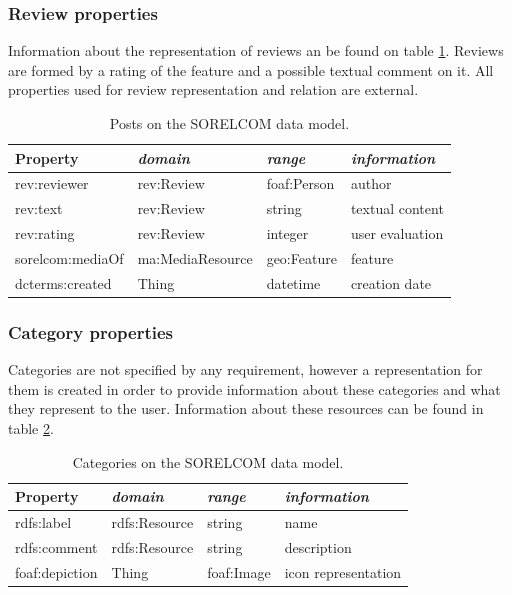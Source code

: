 \subsubsection*{Review properties}

Information about the representation of reviews an be found on table \ref{tab:review}. Reviews are formed by a rating of the feature and a possible textual comment on it. All properties used for review representation and relation are external.

\begin{table}[ht]
  \centering
  \caption{Posts on the SORELCOM data model.}\label{tab:review}
  \begin{tabular}{llll}
    \toprule
      \textbf{Property} & \emph{domain}  & \emph{range} & \emph{information}\\
    \midrule
      rev:reviewer & rev:Review & foaf:Person & author \\
      rev:text & rev:Review & string & textual content \\
      rev:rating & rev:Review & integer & user evaluation \\
      sorelcom:mediaOf & ma:MediaResource & geo:Feature & feature \\
      dcterms:created & Thing & datetime & creation date \\
    \bottomrule
  \end{tabular}
\end{table}

\subsubsection*{Category properties}

Categories are not specified by any requirement, however a representation for them is created in order to provide information about these categories and what they represent to the user. Information about these resources can be found in table \ref{tab:category}.

\begin{table}[ht]
  \centering
  \caption{Categories on the SORELCOM data model.}\label{tab:category}
  \begin{tabular}{llll}
    \toprule
      \textbf{Property} & \emph{domain}  & \emph{range} & \emph{information}\\
    \midrule
      rdfs:label & rdfs:Resource & string & name \\
      rdfs:comment & rdfs:Resource & string & description \\
      foaf:depiction & Thing & foaf:Image & icon representation \\
    \bottomrule
  \end{tabular}
\end{table}

